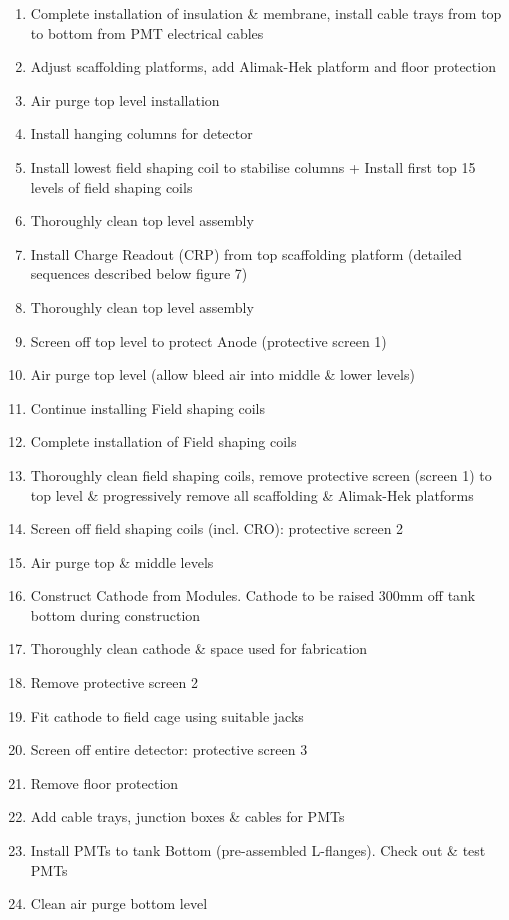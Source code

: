 \begin{enumerate}
\item{Complete installation of insulation \& membrane, install cable trays from top to bottom from PMT electrical cables}
\item{Adjust scaffolding platforms, add Alimak-Hek platform and floor protection}
\item{Air purge top level installation}
\item{Install hanging columns for detector}
\item{Install lowest field shaping coil to stabilise columns + Install first top 15 levels of field shaping coils}
\item{Thoroughly clean top level assembly}
\item{Install Charge Readout (CRP) from top scaffolding platform (detailed sequences described below figure 7)}
\item{Thoroughly clean top level assembly}
\item{Screen off top level to protect Anode (protective screen 1)}
\item{Air purge top level (allow bleed air into middle \& lower levels)}
\item{Continue installing Field shaping coils}
\item{Complete installation of Field shaping coils}
\item{Thoroughly clean field shaping coils, remove protective screen (screen 1) to top level \& progressively remove all scaffolding \& Alimak-Hek platforms}
\item{Screen off field shaping coils (incl. CRO): protective screen 2}
\item{Air purge top \& middle levels}
\item{Construct Cathode from Modules. Cathode to be raised 300mm off tank bottom during construction}
\item{Thoroughly clean cathode \& space used for fabrication}
\item{Remove protective screen 2}
\item{Fit cathode to field cage using suitable jacks}
\item{Screen off entire detector: protective screen 3}
\item{Remove floor protection}
\item{Add cable trays, junction boxes \& cables for PMTs}
\item{Install PMTs to tank Bottom (pre-assembled L-flanges). Check out \& test PMTs}
\item{Clean air purge bottom level}

\end{enumerate}
